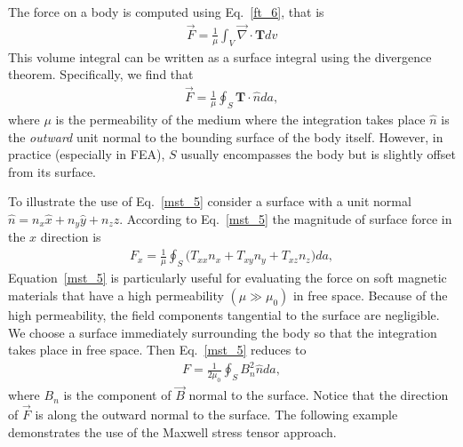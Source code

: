 \documentclass[11pt,a4paper,oneside]{book}
\numberwithin{equation}{section}
\theoremstyle{it}
\theoremstyle{definition}
\begin{document}
The force on a body is computed using Eq.~\eqref{ft_6}, that is
\begin{equation*}\label{}
	\begin{aligned}
		\vec{F} = \frac{1}{\mu} \int_{V}\vec{\nabla}\cdot\mathbf{T}dv 
	\end{aligned}
\end{equation*}
This volume integral can be written as a surface integral using the divergence theorem. Specifically, we find that
\begin{equation}\label{mst_5}
	\begin{aligned}
		\vec{F} = \frac{1}{\mu} \oint_{S}\mathbf{T}\cdot\hat{n}da, 
	\end{aligned}
\end{equation}
where $\mu$ is the permeability of the medium where the integration takes place $\hat{n}$ is the \textit{outward} unit normal to the bounding surface of the body itself. However, in practice (especially in FEA), $S$ usually encompasses the body but is slightly offset from its surface.

To illustrate the use of Eq.~\eqref{mst_5} consider a surface with a unit normal $\hat{n}=n_x\hat{x}+n_y\hat{y}+n_z\hat{z}$. According to Eq.~\eqref{mst_5} the magnitude of surface force in the $x$ direction is 
\begin{equation}\label{mst_6}
	\begin{aligned}
		F_x = \frac{1}{\mu} \oint_{S}\Big(T_{xx}n_x+T_{xy}n_y+T_{xz}n_z\Big)da, 
	\end{aligned}
\end{equation}
Equation~\ref{mst_5} is particularly useful for evaluating the force on soft magnetic materials that have a high permeability $(\mu\gg\mu_0)$ in free space. Because of the high permeability, the field components tangential to the surface are negligible. We choose a surface immediately surrounding the body so that the integration takes place in free space. Then Eq.~\eqref{mst_5} reduces to
\begin{equation}\label{mst_7}
	\begin{aligned}
		F = \frac{1}{2\mu_0} \oint_{S}B_n^2\hat{n}da, 
	\end{aligned}
\end{equation}
where $B_n$ is the component of $\vec{B}$ normal to the surface. Notice that the direction of $\vec{F}$ is along the outward normal to the surface. The following example demonstrates the use of the Maxwell stress tensor approach. 
\end{document}
